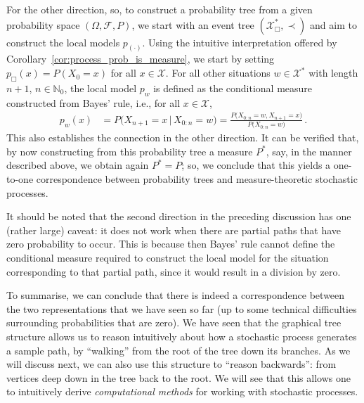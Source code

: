 \documentclass[graybox]{svmult}
\newcommand{\nats}{\mathbb{N}}
\newcommand{\natswith}{\nats_{0}}
\newcommand{\states}{\mathcal{X}}
\begin{document}
For the other direction, so, to construct a probability tree from a given probability space $(\Omega,\mathcal{F},P)$, we start with an event tree $(\states^*_\Box,\prec)$ and aim to construct the local models $p_{(\cdot)}$. Using the intuitive interpretation offered by Corollary~\ref{cor:process_prob_is_measure}, we start by setting $p_\Box(x)=P(X_0=x)$ for all $x\in\states$. For all other situations $w\in\states^*$ with length $n+1$, $n\in\natswith$, the local model $p_w$ is defined as the conditional measure constructed from Bayes' rule, i.e., for all $x\in\states$,
\begin{align*}
p_w(x) &= P\bigl( X_{n+1}=x\,\big\vert\, X_{0:n}=w \bigr) = \frac{P\bigl(X_{0:n}=w, X_{n+1}=x\bigr)}{P\bigl( X_{0:n}=w \bigr)}\,.
\end{align*}
This also establishes the connection in the other direction. It can be verified that, by now constructing from this probability tree a measure $P^*$, say, in the manner described above, we obtain again $P^*=P$; so, we conclude that this yields a one-to-one correspondence between probability trees and measure-theoretic stochastic processes.

It should be noted that the second direction in the preceding discussion has one (rather large) caveat: it does not work when there are partial paths that have zero probability to occur. This is because then Bayes' rule cannot define the conditional measure required to construct the local model for the situation corresponding to that partial path, since it would result in a division by zero.

To summarise, we can conclude that there is indeed a correspondence between the two representations that we have seen so far (up to some technical difficulties surrounding probabilities that are zero). We have seen that the graphical tree structure allows us to reason intuitively about how a stochastic process generates a sample path, by ``walking'' from the root of the tree down its branches. As we will discuss next, we can also use this structure to ``reason backwards'': from vertices deep down in the tree back to the root. We will see that this allows one to intuitively derive \emph{computational methods} for working with stochastic processes. 
\end{document}
